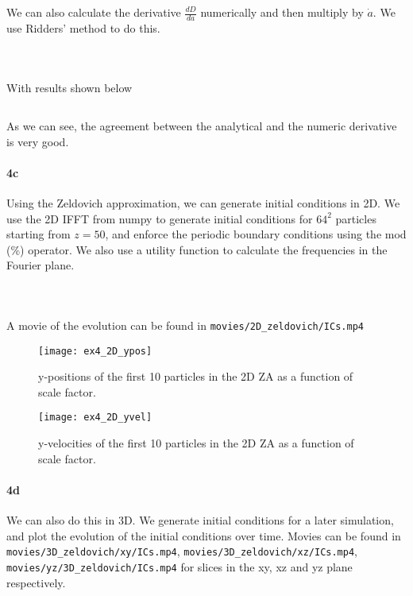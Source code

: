 We can also calculate the derivative $\frac{dD}{da}$ numerically and then multiply by $\dot{a}$.
We use Ridders' method to do this.

\inputminted[firstline=73]{Python}{../integration.py}
\inputminted[firstline=82, lastline=86]{Python}{../ex4.py}
\inputminted[firstline=151, lastline=158]{Python}{../ex4.py}

With results shown below
\inputminted[firstline=2]{text}{../output/ex4.txt}
As we can see, the agreement between the analytical and the numeric derivative is very good.

\paragraph{4c}
Using the Zeldovich approximation, we can generate initial conditions in 2D.
We use the 2D IFFT from numpy to generate initial conditions for $64^2$ particles starting from $z=50$, and enforce the periodic boundary conditions using the mod (\%) operator.
We also use a utility function to calculate the frequencies in the Fourier plane.

\inputminted[firstline=74]{Python}{../fft.py}
\inputminted[firstline=88, lastline=111]{Python}{../ex4.py}
\inputminted[firstline=160, lastline=207]{Python}{../ex4.py}

A movie of the evolution can be found in \texttt{movies/2D\_zeldovich/ICs.mp4}

\begin{figure}[h]
  \centering
  \texttt{[image: ex4\_2D\_ypos]}
  \caption{y-positions of the first 10 particles in the 2D ZA as a function of scale factor.}
\end{figure}

\begin{figure}[h]
  \centering
  \texttt{[image: ex4\_2D\_yvel]}
  \caption{y-velocities of the first 10 particles in the 2D ZA as a function of scale factor.}
\end{figure}

\clearpage

\paragraph{4d}
We can also do this in 3D.
We generate initial conditions for a later simulation, and plot the evolution of the initial conditions over time.
Movies can be found in \texttt{movies/3D\_zeldovich/xy/ICs.mp4}, \texttt{movies/3D\_zeldovich/xz/ICs.mp4}, \texttt{movies/yz/3D\_zeldovich/ICs.mp4} for slices in the xy, xz and yz plane respectively.

